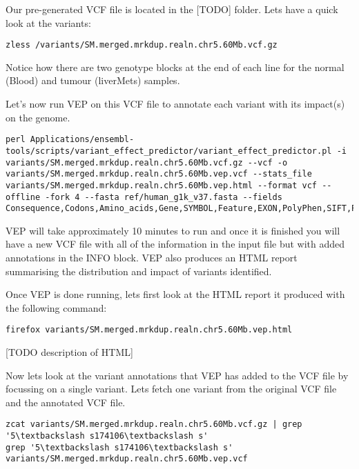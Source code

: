 \begin{steps}
Our pre-generated VCF file is located in the [TODO] folder. Lets have a quick look at the variants:
\begin{lstlisting}
zless /variants/SM.merged.mrkdup.realn.chr5.60Mb.vcf.gz
\end{lstlisting}
\end{steps}

Notice how there are two genotype blocks at the end of each line for the normal (Blood) and tumour (liverMets) samples.

Let's now run VEP on this VCF file to annotate each variant with its impact(s) on the genome.

\begin{steps}
\begin{lstlisting}
perl Applications/ensembl-tools/scripts/variant_effect_predictor/variant_effect_predictor.pl -i variants/SM.merged.mrkdup.realn.chr5.60Mb.vcf.gz --vcf -o variants/SM.merged.mrkdup.realn.chr5.60Mb.vep.vcf --stats_file variants/SM.merged.mrkdup.realn.chr5.60Mb.vep.html --format vcf --offline -fork 4 --fasta ref/human_g1k_v37.fasta --fields Consequence,Codons,Amino_acids,Gene,SYMBOL,Feature,EXON,PolyPhen,SIFT,Protein_position,BIOTYPE
\end{lstlisting}
\end{steps}

VEP will take approximately 10 minutes to run and once it is finished you will have a new VCF file with all of the information in the input file but with added annotations in the INFO block. VEP also produces an HTML report summarising the distribution and impact of variants identified.

\begin{steps}
Once VEP is done running, lets first look at the HTML report it produced with the following command:
\begin{lstlisting}
firefox variants/SM.merged.mrkdup.realn.chr5.60Mb.vep.html
\end{lstlisting}
\end{steps}


[TODO description of HTML]

\begin{steps}
Now lets look at the variant annotations that VEP has added to the VCF file by focussing on a single variant. Lets fetch one variant from the original VCF file and the annotated VCF file.
\begin{lstlisting}
zcat variants/SM.merged.mrkdup.realn.chr5.60Mb.vcf.gz | grep '5\textbackslash s174106\textbackslash s'
grep '5\textbackslash s174106\textbackslash s' variants/SM.merged.mrkdup.realn.chr5.60Mb.vep.vcf
\end{lstlisting}
\end{steps}


